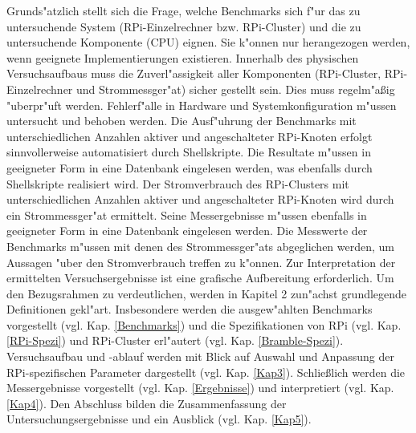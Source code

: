 Grunds"atzlich stellt sich die Frage, welche Benchmarks sich f"ur das zu untersuchende System (RPi-Einzelrechner bzw. RPi-Cluster) und die zu untersuchende Komponente (CPU) eignen. Sie k"onnen nur herangezogen werden, wenn geeignete Implementierungen existieren. Innerhalb des physischen Versuchsaufbaus muss die Zuverl"assigkeit aller Komponenten (RPi-Cluster, RPi-Einzelrechner und Strommessger"at) sicher gestellt sein. Dies muss regelm"a\ss ig "uberpr"uft werden. Fehlerf"alle in Hardware und Systemkonfiguration m"ussen untersucht und behoben werden. Die Ausf"uhrung der Benchmarks mit unterschiedlichen Anzahlen aktiver und angeschalteter RPi-Knoten erfolgt sinnvollerweise automatisiert durch Shellskripte. Die Resultate m"ussen in geeigneter Form in eine Datenbank eingelesen werden, was ebenfalls durch Shellskripte realisiert wird. Der Stromverbrauch des RPi-Clusters mit unterschiedlichen Anzahlen aktiver und angeschalteter RPi-Knoten wird durch ein Strommessger"at ermittelt. Seine Messergebnisse m"ussen ebenfalls in geeigneter Form in eine Datenbank eingelesen werden. Die Messwerte der Benchmarks m"ussen mit denen des Strommessger"ats abgeglichen werden, um Aussagen "uber den Stromverbrauch treffen zu k"onnen. Zur Interpretation der ermittelten Versuchsergebnisse ist eine grafische Aufbereitung erforderlich.
\newpage
\noindent
Um den Bezugsrahmen zu verdeutlichen, werden in Kapitel 2 zun"achst grundlegende Definitionen gekl"art. Insbesondere werden die ausgew"ahlten Benchmarks vorgestellt (vgl. Kap. \ref{Benchmarks}) und die Spezifikationen von RPi (vgl. Kap. \ref{RPi-Spezi}) und RPi-Cluster erl"autert (vgl. Kap. \ref{Bramble-Spezi}). Versuchsaufbau und -ablauf werden mit Blick auf Auswahl und Anpassung der RPi-spezifischen Parameter dargestellt (vgl. Kap. \ref{Kap3}). Schlie\ss lich werden die Messergebnisse vorgestellt (vgl. Kap. \ref{Ergebnisse}) und interpretiert (vgl. Kap. \ref{Kap4}). Den Abschluss bilden die Zusammenfassung der Untersuchungsergebnisse und ein Ausblick (vgl. Kap. \ref{Kap5}).

\endinput 

